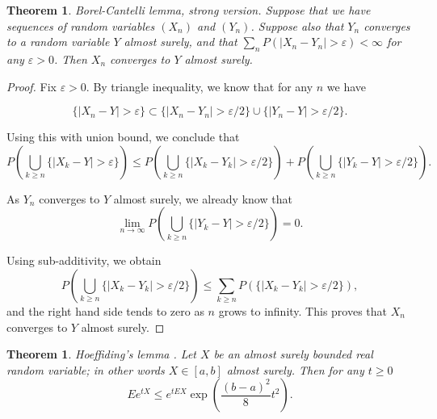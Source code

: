 \documentclass[12pt,a4paper,leqno]{report}
\newcommand{\eps}{\varepsilon}
\theoremstyle{plain}
\newtheorem{theo}[equation]{Theorem}
\theoremstyle{definition}
\theoremstyle{remark}
\begin{document}
\begin{theo}
Borel-Cantelli lemma, strong version. Suppose that we have sequences of random variables $(X_n)$ and $(Y_n)$. Suppose also that $Y_n$ converges to a random variable $Y$ almost surely, and that $ \sum_n P(|X_n-Y_n|>\eps) < \infty$ for any $\eps > 0$. Then $X_n$ converges to $Y$ almost surely. 
\end{theo}

\begin{proof}
Fix $\eps > 0$. By triangle inequality, we know that for any $n$ we have

\begin{equation*}
\{|X_n-Y|>\eps\} \subset \{|X_n-Y_n|>\eps /2\} \cup \{|Y_n-Y|>\eps /2\}.
\end{equation*}

Using this with union bound, we conclude that 
\begin{equation*}
P(\bigcup_{k\geq n}\{|X_k-Y|>\eps\}) \leq P(\bigcup_{k\geq n}\{|X_k-Y_k|>\eps /2\}) + P(\bigcup_{k\geq n}\{|Y_k-Y|>\eps /2\}).
\end{equation*}

As $Y_n$ converges to $Y$ almost surely, we already know that 
\begin{equation*}
\lim_{n \to \infty} P(\bigcup_{k\geq n}\{|Y_k-Y|>\eps /2\}) = 0.
\end{equation*}

Using sub-additivity, we obtain
\begin{equation*}
P(\bigcup_{k\geq n}\{|X_k-Y_k|>\eps /2\}) \leq \sum_{k\geq n} P(\{|X_k-Y_k|>\eps /2\}),
\end{equation*}
and the right hand side tends to zero as $n$ grows to infinity. This proves that $X_n$ converges to $Y$ almost surely.
\end{proof}

\begin{theo}
Hoeffiding's lemma \cite{Hoef}. Let $X$ be an almost surely bounded real random variable; in other words $X \in [a,b]$ almost surely. Then for any $t \geq 0$
\begin{equation*}
Ee^{tX} \leq e^{tEX} \exp(\frac{(b-a)^2}{8}t^2).
\end{equation*}
\end{theo}
\end{document}
